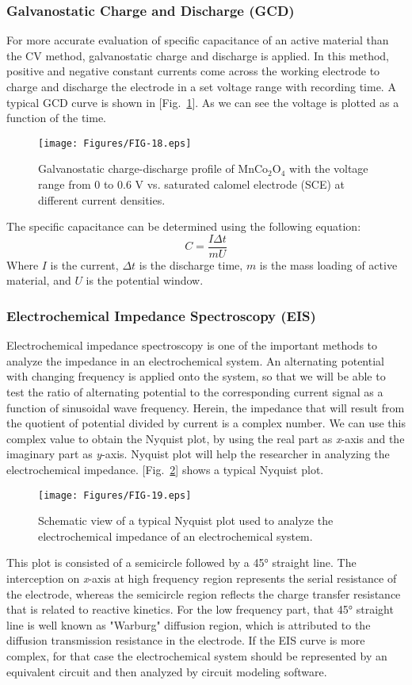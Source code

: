 \documentclass[reprint,amsmath,amssymb,aps,floatfix,
]{revtex4-2}
\begin{document}
\subsubsection{Galvanostatic Charge and Discharge (GCD)}
For more accurate evaluation of specific capacitance of an active material than the CV method, galvanostatic charge and discharge is applied. In this method, positive and negative constant currents come across the working electrode to charge and discharge the electrode in a set voltage range with recording time. A typical GCD curve is shown in [Fig.~\ref{fig:fig18}]. As we can see the voltage is plotted as a function of the time. 
\begin{figure}[b]
    \centering
    \texttt{[image: Figures/FIG-18.eps]}
    \caption{\label{fig:fig18}Galvanostatic charge-discharge profile of MnCo$_2$O$_4$ with the voltage range from 0 to 0.6 V vs. saturated calomel electrode (SCE) at different current densities.}
    \end{figure}
The specific capacitance can be determined using the following equation:
\begin{equation}
    C = \frac{I\Delta t}{mU}    
\end{equation}
Where $I$ is the current, $\Delta t$ is the discharge time, $m$ is the mass loading of active material, and $U$ is the potential window.
\subsubsection{Electrochemical Impedance Spectroscopy (EIS)}
Electrochemical impedance spectroscopy is one of the important methods to analyze the impedance in an electrochemical system. An alternating potential with changing frequency is applied onto the system, so that we will be able to test the ratio of alternating potential to the corresponding current signal as a function of sinusoidal wave frequency. Herein, the impedance that will result from the quotient of potential divided by current is a complex number. We can use this complex value to obtain the Nyquist plot, by using the real part as {\it x}-axis and the imaginary part as {\it y}-axis. Nyquist plot will help the researcher in analyzing the electrochemical impedance. [Fig.~\ref{fig:fig19}] shows a typical Nyquist plot.
\begin{figure}[t]
    \centering
    \texttt{[image: Figures/FIG-19.eps]}
    \caption{\label{fig:fig19}Schematic view of a typical Nyquist plot used to analyze the electrochemical impedance of an electrochemical system.}
    \end{figure}
This plot is consisted of a semicircle followed by a \ang{45} straight line. The interception on {\it x}-axis at high frequency region represents the serial resistance of the electrode, whereas the semicircle region reflects the charge transfer resistance that is related to reactive kinetics. For the low frequency part, that \ang{45} straight line is well known as "Warburg" diffusion region, which is attributed to the diffusion transmission resistance in the electrode. If the EIS curve is more complex, for that case the electrochemical system should be represented by an equivalent circuit and then analyzed by circuit modeling software.
\end{document}
